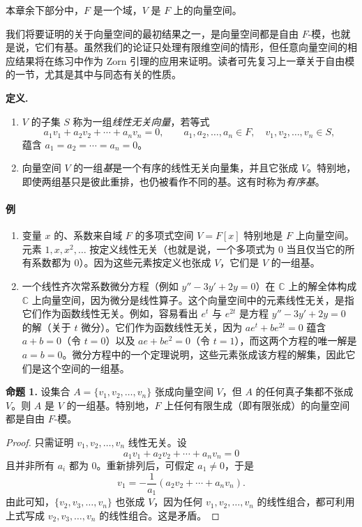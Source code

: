 本章余下部分中，$F$ 是一个域，$V$ 是 $F$ 上的向量空间。

我们将要证明的关于向量空间的最初结果之一，是向量空间都是自由 $F$-模，也就是说，它们有基。虽然我们的论证只处理有限维空间的情形，但任意向量空间的相应结果将在练习中作为 Zorn 引理的应用来证明。读者可先复习上一章关于自由模的一节，尤其是其中与同态有关的性质。

\noindent\textbf{定义.}
\begin{enumerate}[label=(\arabic*)]
\item $V$ 的子集 $S$ 称为一组\emph{线性无关向量}，若等式
\[
a_1v_1+a_2v_2+\cdots+a_nv_n=0,
\qquad a_1,a_2,\ldots,a_n\in F,
\quad v_1,v_2,\ldots,v_n\in S,
\]
蕴含 $a_1=a_2=\cdots=a_n=0$。
\item 向量空间 $V$ 的一组\emph{基}是一个有序的线性无关向量集，并且它张成 $V$。特别地，即使两组基只是彼此重排，也仍被看作不同的基。这有时称为\emph{有序基}。
\end{enumerate}

\paragraph{例}
\begin{enumerate}[label=(\arabic*)]
\item 变量 $x$ 的、系数来自域 $F$ 的多项式空间 $V=F[x]$ 特别地是 $F$ 上向量空间。元素 $1,x,x^2,\ldots$ 按定义线性无关（也就是说，一个多项式为 $0$ 当且仅当它的所有系数都为 $0$）。因为这些元素按定义也张成 $V$，它们是 $V$ 的一组基。
\item 一个线性齐次常系数微分方程（例如 $y''-3y'+2y=0$）在 $\mathbb C$ 上的解全体构成 $\mathbb C$ 上向量空间，因为微分是线性算子。这个向量空间中的元素线性无关，是指它们作为函数线性无关。例如，容易看出 $e^t$ 与 $e^{2t}$ 是方程 $y''-3y'+2y=0$ 的解（关于 $t$ 微分）。它们作为函数线性无关，因为 $ae^t+be^{2t}=0$ 蕴含 $a+b=0$（令 $t=0$）以及 $ae+be^2=0$（令 $t=1$），而这两个方程的唯一解是 $a=b=0$。微分方程中的一个定理说明，这些元素张成该方程的解集，因此它们是这个空间的一组基。
\end{enumerate}

\noindent\textbf{命题 1.} 设集合 $A=\{v_1,v_2,\ldots,v_n\}$ 张成向量空间 $V$，但 $A$ 的任何真子集都不张成 $V$。则 $A$ 是 $V$ 的一组基。特别地，$F$ 上任何有限生成（即有限张成）的向量空间都是自由 $F$-模。

\begin{proof}
只需证明 $v_1,v_2,\ldots,v_n$ 线性无关。设
\[
a_1v_1+a_2v_2+\cdots+a_nv_n=0
\]
且并非所有 $a_i$ 都为 $0$。重新排列后，可假定 $a_1\neq0$，于是
\[
v_1=-\frac1{a_1}(a_2v_2+\cdots+a_nv_n).
\]
由此可知，$\{v_2,v_3,\ldots,v_n\}$ 也张成 $V$，因为任何 $v_1,v_2,\ldots,v_n$ 的线性组合，都可利用上式写成 $v_2,v_3,\ldots,v_n$ 的线性组合。这是矛盾。
\end{proof}


